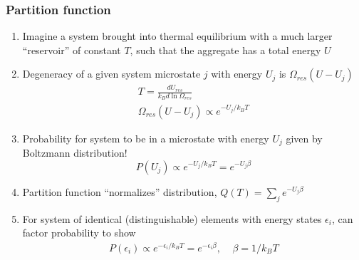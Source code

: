\documentclass[11pt]{article}
\begin{document}
\subsubsection{Partition function}
\label{sec:org23e8719}
\begin{enumerate}
\item Imagine a system brought into thermal equilibrium with a much larger ``reservoir'' of constant \(T\), such that the aggregate has a total energy \(U\)
\item Degeneracy of a given system microstate \(j\) with energy \(U_j\) is \(\Omega_{res}(U-U_j)\)
\begin{eqnarray*}
  T = \frac{dU_{res}}{k_Bd\ln\Omega_{res}} \\
  \Omega_{res}(U-U_j) \propto e^{-U_j/k_B T}
\end{eqnarray*}
\item Probability for system to be in a microstate with energy \(U_j\) given by Boltzmann distribution!
\begin{displaymath}
  P(U_j) \propto e^{-U_j/k_B T} = e^{-U_j \beta}
\end{displaymath}
\item Partition function ``normalizes'' distribution, \(Q(T) = \sum_j e^{-U_j \beta}\)
\item For system of identical (distinguishable) elements with energy states \(\epsilon_i\), can factor probability to show
\begin{eqnarray*}
  P(\epsilon_i) \propto e^{-\epsilon_i/k_B T} = e^{-\epsilon_i \beta},\
  \ \ \ \ \beta=1/k_BT
\end{eqnarray*}
\end{enumerate}
\end{document}
